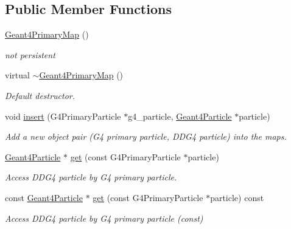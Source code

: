 \subsection*{Public Member Functions}
\begin{DoxyCompactItemize}
\item 
\hyperlink{class_d_d4hep_1_1_simulation_1_1_geant4_primary_map_af51091630c9dbeb00db33d3871af05e4}{Geant4\+Primary\+Map} ()
\begin{DoxyCompactList}\small\item\em not persistent \end{DoxyCompactList}\item 
virtual \hyperlink{class_d_d4hep_1_1_simulation_1_1_geant4_primary_map_a7e013501b60e0d0516648405dcf7affd}{$\sim$\+Geant4\+Primary\+Map} ()
\begin{DoxyCompactList}\small\item\em Default destructor. \end{DoxyCompactList}\item 
void \hyperlink{class_d_d4hep_1_1_simulation_1_1_geant4_primary_map_affe8f0277373092a08624108d677e7f2}{insert} (G4\+Primary\+Particle $\ast$g4\+\_\+particle, \hyperlink{class_d_d4hep_1_1_simulation_1_1_geant4_particle}{Geant4\+Particle} $\ast$particle)
\begin{DoxyCompactList}\small\item\em Add a new object pair (G4 primary particle, D\+D\+G4 particle) into the maps. \end{DoxyCompactList}\item 
\hyperlink{class_d_d4hep_1_1_simulation_1_1_geant4_particle}{Geant4\+Particle} $\ast$ \hyperlink{class_d_d4hep_1_1_simulation_1_1_geant4_primary_map_a4b4f4c2acc5258bdf1cc2b1c9aa735d9}{get} (const G4\+Primary\+Particle $\ast$particle)
\begin{DoxyCompactList}\small\item\em Access D\+D\+G4 particle by G4 primary particle. \end{DoxyCompactList}\item 
const \hyperlink{class_d_d4hep_1_1_simulation_1_1_geant4_particle}{Geant4\+Particle} $\ast$ \hyperlink{class_d_d4hep_1_1_simulation_1_1_geant4_primary_map_ad83a5afabaec4155401815c7186da676}{get} (const G4\+Primary\+Particle $\ast$particle) const
\begin{DoxyCompactList}\small\item\em Access D\+D\+G4 particle by G4 primary particle (const) \end{DoxyCompactList}\item 

\end{DoxyCompactItemize}
